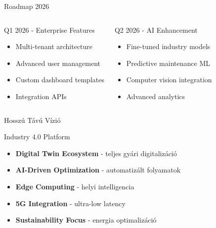 \documentclass[aspectratio=169,10pt]{beamer}
\newcommand{\highlight}[1]{\textcolor{virtplc-blue}{\textbf{#1}}}
\begin{document}
\begin{frame}{Roadmap 2026}
    \begin{columns}[c]
        \begin{block}{Q1 2026 - Enterprise Features}
            \begin{itemize}
                \item Multi-tenant architecture
                \item Advanced user management
                \item Custom dashboard templates
                \item Integration APIs
            \end{itemize}
        \end{block}
        
        \begin{block}{Q2 2026 - AI Enhancement}
            \begin{itemize}
                \item Fine-tuned industry models
                \item Predictive maintenance ML
                \item Computer vision integration
                \item Advanced analytics
            \end{itemize}
        \end{block}
    \end{columns}
\end{frame}

\begin{frame}{Hosszú Távú Vízió}
    \begin{block}{Industry 4.0 Platform}
        \begin{itemize}
            \item \highlight{Digital Twin Ecosystem} - teljes gyári digitalizáció
            \item \highlight{AI-Driven Optimization} - automatizált folyamatok
            \item \highlight{Edge Computing} - helyi intelligencia
            \item \highlight{5G Integration} - ultra-low latency
            \item \highlight{Sustainability Focus} - energia optimalizáció
        \end{itemize}
    \end{block}
\end{frame}
\end{document}
